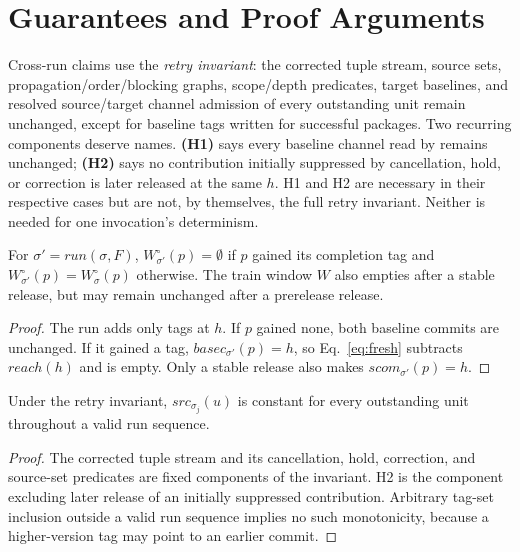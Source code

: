 \section{Guarantees and Proof Arguments}
\label{sec:guarantees}

Cross-run claims use the \emph{retry invariant}: the corrected tuple
stream, source sets, propagation/order/blocking graphs, scope/depth predicates, target baselines, and
resolved source/target channel admission of every outstanding unit remain
unchanged, except for baseline tags written for successful packages.
Two recurring components deserve names. \textbf{(H1)} says every baseline
channel read by  remains unchanged;
\textbf{(H2)} says no contribution initially suppressed by cancellation,
hold, or correction is later released at the same $h$. H1 and H2 are
necessary in their respective cases but are not, by themselves, the full
retry invariant. Neither is needed for one invocation's determinism.

\begin{lemma}
\label{lem:w}
For $\sigma' = \mathit{run}(\sigma,F)$, $W^\circ_{\sigma'}(p)=\emptyset$
if $p$ gained its completion tag and $W^\circ_{\sigma'}(p)=W^\circ_\sigma(p)$ otherwise.
The train window $W$ also empties after a stable release, but may remain
unchanged after a prerelease release.
\end{lemma}
\begin{proof}
The run adds only tags at $h$. If $p$ gained none, both baseline commits
are unchanged. If it gained a tag, $\mathit{basec}_{\sigma'}(p)=h$, so
Eq.~\ref{eq:fresh} subtracts $\mathit{reach}(h)$ and is empty. Only a
stable release also makes $\mathit{scom}_{\sigma'}(p)=h$.
\end{proof}

\begin{lemma}
\label{lem:s}
Under the retry invariant, $\mathit{src}_{\sigma_j}(u)$ is constant for
every outstanding unit throughout a valid run sequence.
\end{lemma}
\begin{proof}
The corrected tuple stream and its cancellation, hold, correction, and
source-set predicates are fixed components of the invariant. H2 is the
component excluding later release of an initially suppressed contribution.
Arbitrary tag-set inclusion outside a valid run sequence implies no such
monotonicity, because a higher-version tag may point to an earlier commit.
\end{proof}

